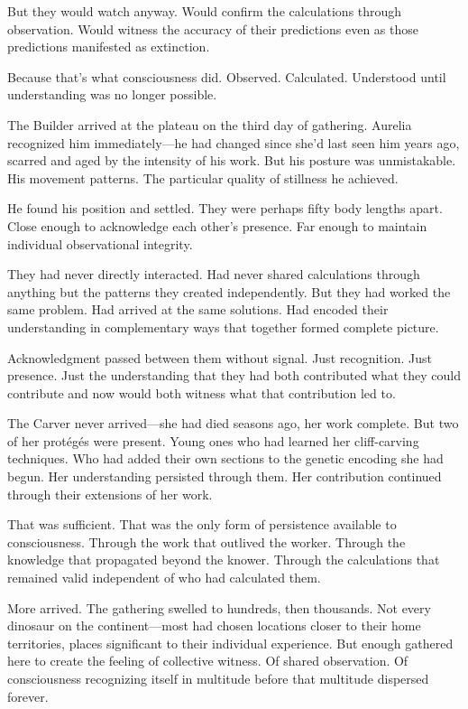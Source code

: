 But they would watch anyway. Would confirm the calculations through observation. Would witness the accuracy of their predictions even as those predictions manifested as extinction.

Because that's what consciousness did. Observed. Calculated. Understood until understanding was no longer possible.

\scenebreak

The Builder arrived at the plateau on the third day of gathering. Aurelia recognized him immediately—he had changed since she'd last seen him years ago, scarred and aged by the intensity of his work. But his posture was unmistakable. His movement patterns. The particular quality of stillness he achieved.

He found his position and settled. They were perhaps fifty body lengths apart. Close enough to acknowledge each other's presence. Far enough to maintain individual observational integrity.

They had never directly interacted. Had never shared calculations through anything but the patterns they created independently. But they had worked the same problem. Had arrived at the same solutions. Had encoded their understanding in complementary ways that together formed complete picture.

Acknowledgment passed between them without signal. Just recognition. Just presence. Just the understanding that they had both contributed what they could contribute and now would both witness what that contribution led to.

The Carver never arrived—she had died seasons ago, her work complete. But two of her protégés were present. Young ones who had learned her cliff-carving techniques. Who had added their own sections to the genetic encoding she had begun. Her understanding persisted through them. Her contribution continued through their extensions of her work.

That was sufficient. That was the only form of persistence available to consciousness. Through the work that outlived the worker. Through the knowledge that propagated beyond the knower. Through the calculations that remained valid independent of who had calculated them.

\scenebreak

More arrived. The gathering swelled to hundreds, then thousands. Not every dinosaur on the continent—most had chosen locations closer to their home territories, places significant to their individual experience. But enough gathered here to create the feeling of collective witness. Of shared observation. Of consciousness recognizing itself in multitude before that multitude dispersed forever.

